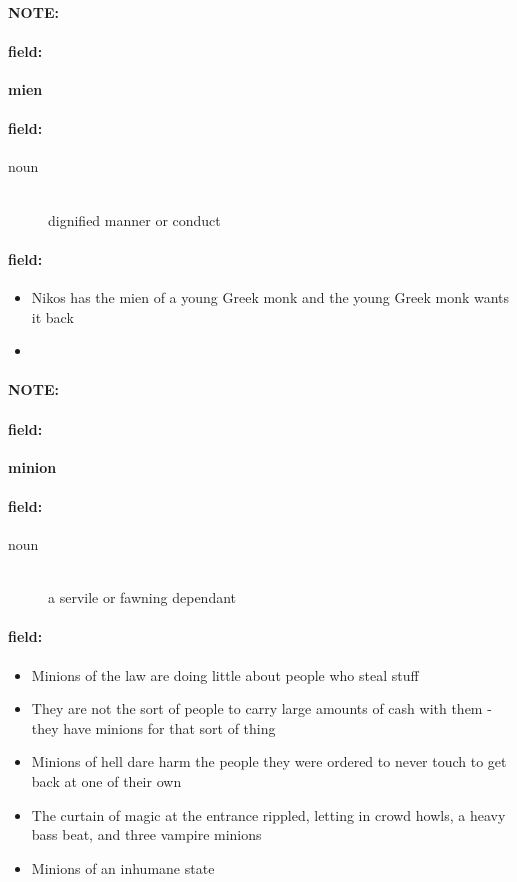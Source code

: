 \documentclass[12pt]{article}
\newenvironment{note}{\paragraph{NOTE:}}{}
\newenvironment{field}{\paragraph{field:}}{}
\begin{document}
\begin{note}
\begin{field}
\textbf{\large mien}
\end{field}


\begin{field}
\begin{description}
\item[noun] \hfill \\ 
dignified manner or conduct

\end{description}
\end{field}

\begin{field}
\begin{itemize}
\item Nikos has the mien of a young Greek monk and the young Greek monk wants it back
\item 
\end{itemize}
\end{field}
\end{note}
\begin{note}
\begin{field}
\textbf{\large minion}
\end{field}


\begin{field}
\begin{description}
\item[noun] \hfill \\ 
a servile or fawning dependant

\end{description}
\end{field}

\begin{field}
\begin{itemize}
\item Minions of the law are doing little about people who steal stuff
\item They are not the sort of people to carry large amounts of cash with them - they have minions for that sort of thing
\item Minions of hell dare harm the people they were ordered to never touch to get back at one of their own
\item The curtain of magic at the entrance rippled, letting in crowd howls, a heavy bass beat, and three vampire minions
\item Minions of an inhumane state
\end{itemize}
\end{field}
\end{note}
\end{document}

